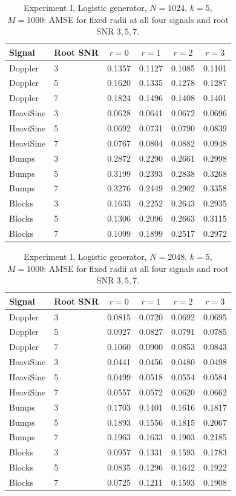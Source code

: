 \documentclass[11pt]{article}
\numberwithin{equation}{section}
\begin{document}
\begin{table}[H]
\centering\small
\caption{Experiment I, Logistic generator, $N=1024$, $k=5$, $M=1000$: AMSE for fixed radii at all four signals and root SNR $3,5,7$.}
\label{tab:s5-e1-logistic-1024}
\setlength{\tabcolsep}{5pt}
\begin{tabular}{llcccc}
\toprule
Signal & Root SNR & $r=0$ & $r=1$ & $r=2$ & $r=3$ \\
\midrule
Doppler & 3 & 0.1357 & 0.1127 & 0.1085 & 0.1101 \\
Doppler & 5 & 0.1620 & 0.1335 & 0.1278 & 0.1287 \\
Doppler & 7 & 0.1824 & 0.1496 & 0.1408 & 0.1401 \\
HeaviSine & 3 & 0.0628 & 0.0641 & 0.0672 & 0.0696 \\
HeaviSine & 5 & 0.0692 & 0.0731 & 0.0790 & 0.0839 \\
HeaviSine & 7 & 0.0767 & 0.0804 & 0.0882 & 0.0948 \\
Bumps & 3 & 0.2872 & 0.2290 & 0.2661 & 0.2998 \\
Bumps & 5 & 0.3199 & 0.2393 & 0.2838 & 0.3268 \\
Bumps & 7 & 0.3276 & 0.2449 & 0.2902 & 0.3358 \\
Blocks & 3 & 0.1633 & 0.2252 & 0.2643 & 0.2935 \\
Blocks & 5 & 0.1306 & 0.2096 & 0.2663 & 0.3115 \\
Blocks & 7 & 0.1099 & 0.1899 & 0.2517 & 0.2972 \\
\bottomrule
\end{tabular}
\end{table}

\begin{table}[H]
\centering\small
\caption{Experiment I, Logistic generator, $N=2048$, $k=5$, $M=1000$: AMSE for fixed radii at all four signals and root SNR $3,5,7$.}
\label{tab:s5-e1-logistic-2048}
\setlength{\tabcolsep}{5pt}
\begin{tabular}{llcccc}
\toprule
Signal & Root SNR & $r=0$ & $r=1$ & $r=2$ & $r=3$ \\
\midrule
Doppler & 3 & 0.0815 & 0.0720 & 0.0692 & 0.0695 \\
Doppler & 5 & 0.0927 & 0.0827 & 0.0791 & 0.0785 \\
Doppler & 7 & 0.1060 & 0.0900 & 0.0853 & 0.0843 \\
HeaviSine & 3 & 0.0441 & 0.0456 & 0.0480 & 0.0498 \\
HeaviSine & 5 & 0.0499 & 0.0518 & 0.0554 & 0.0584 \\
HeaviSine & 7 & 0.0557 & 0.0572 & 0.0620 & 0.0662 \\
Bumps & 3 & 0.1703 & 0.1401 & 0.1616 & 0.1817 \\
Bumps & 5 & 0.1893 & 0.1556 & 0.1815 & 0.2067 \\
Bumps & 7 & 0.1963 & 0.1633 & 0.1903 & 0.2185 \\
Blocks & 3 & 0.0957 & 0.1331 & 0.1593 & 0.1783 \\
Blocks & 5 & 0.0835 & 0.1296 & 0.1642 & 0.1922 \\
Blocks & 7 & 0.0725 & 0.1211 & 0.1593 & 0.1908 \\
\bottomrule
\end{tabular}
\end{table}
\end{document}
